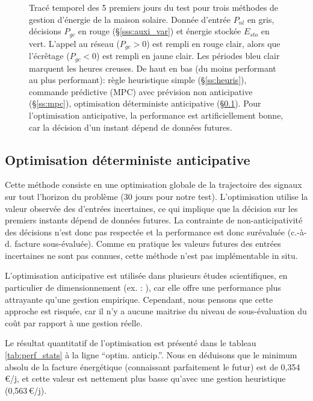 \documentclass[a4paper,10pt,twocolumn]{article}
\begin{document}
\begin{figure}
  \caption{Tracé temporel des 5 premiers jours du test pour trois méthodes
  de gestion d'énergie de la maison solaire.
  Donnée d'entrée $P_{nl}$ en gris, décisions $P_{gc}$ en rouge (§\ref{sss:auxi_var})
  et énergie stockée $E_{sto}$ en vert.
  L'appel au réseau ($P_{gc}>0$) est rempli en rouge clair,
  alors que l'écrêtage ($P_{gc}<0$) est rempli en jaune clair.
  Les périodes bleu clair marquent les heures creuses.
  De haut en bas (du moins performant au plus performant):
  règle heuristique simple (§\ref{ss:heuris}),
  commande prédictive (MPC) avec prévision non anticipative (§\ref{ss:mpc}),
  optimisation déterministe anticipative (§\ref{ss:anticip}).
  Pour l'optimisation anticipative, la performance est artificiellement bonne,
  car la décision d'un instant dépend de données futures.
  }
  \label{fig:temporel}
\end{figure}

\subsection{Optimisation déterministe anticipative}
\label{ss:anticip}

Cette méthode consiste en une optimisation globale de la trajectoire des signaux
sur tout l'horizon du problème (30 jours pour notre test).
L'optimisation utilise la valeur observée des d'entrées incertaines,
ce qui implique que la décision sur les premiers instants dépend
de données futures.
La contrainte de non-anticipativité des décisions n'est donc pas respectée 
et la performance est donc surévaluée (c.-à-d. facture sous-évaluée).
Comme en pratique les valeurs futures des entrées incertaines ne sont pas connues,
cette méthode n'est pas implémentable in situ.

L'optimisation anticipative est utilisée dans plusieurs études scientifiques,
en particulier de dimensionnement (ex. : \cite{Rigo-Mariani:2014:SGE}),
car elle offre une performance plus attrayante qu'une gestion empirique.
Cependant, nous pensons que cette approche est risquée, car il n'y a aucune maitrise
du niveau de sous-évaluation du coût par rapport à une gestion réelle.

Le résultat quantitatif de l'optimisation est présenté dans le tableau \ref{tab:perf_stats}
à la ligne ``optim. anticip.''.
Nous en déduisons que le minimum absolu de la facture énergétique 
(connaissant parfaitement le futur) est de 0,354\,€/j,
et cette valeur est nettement plus basse qu'avec une gestion heuristique (0,563\,€/j).
\end{document}
